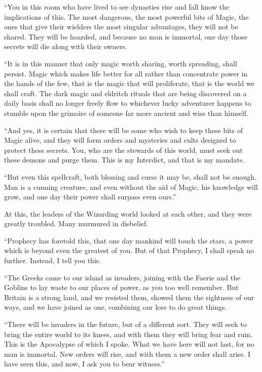 “You in this room who have lived to see dynasties rise and fall know the implications of this. The most dangerous, the most powerful bits of Magic, the ones that give their wielders the most singular advantages, they will not be shared. They will be hoarded, and because no man is immortal, one day those secrets will die along with their owners.

“It is in this manner that only magic worth sharing, worth spreading, shall persist. Magic which makes life better for all rather than concentrate power in the hands of the few, that is the magic that will proliferate, that is the world we shall craft. The dark magic and eldritch rituals that are being discovered on a daily basis shall no longer freely flow to whichever lucky adventurer happens to stumble upon the grimoire of someone far more ancient and wise than himself.

“And yes, it is certain that there will be some who wish to keep these bits of Magic alive, and they will form orders and mysteries and cults designed to protect these secrets. You, who are the stewards of this world, must seek out these demons and purge them. This is my Interdict, and that is my mandate.

“But even this spellcraft, both blessing and curse it may be, shall not be enough. Man is a cunning creature, and even without the aid of Magic, his knowledge will grow, and one day their power shall surpass even ours.”

At this, the leaders of the Wizarding world looked at each other, and they were greatly troubled. Many murmured in disbelief.

“Prophecy has foretold this, that one day mankind will touch the stars, a power which is beyond even the greatest of you. But of that Prophecy, I shall speak no further. Instead, I tell you this.

“The Greeks came to our island as invaders, joining with the Faerie and the Goblins to lay waste to our places of power, as you too well remember. But Britain is a strong land, and we resisted them, showed them the rightness of our ways, and we have joined as one, combining our lore to do great things.

“There will be invaders in the future, but of a different sort. They will seek to bring the entire world to its knees, and with them they will bring fear and ruin. This is the Apocalypse of which I spoke. What we have here will not last, for no man is immortal. New orders will rise, and with them a new order shall arise. I have seen this, and now, I ask you to bear witness.”

